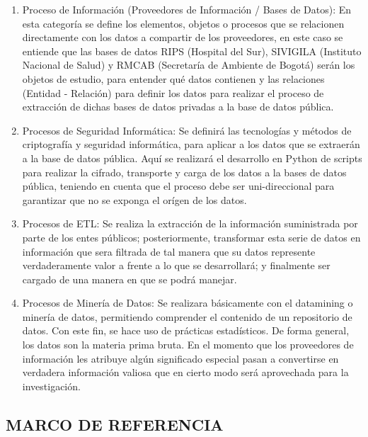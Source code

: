 \documentclass[a4paper, 12pt, oneside]{article}
\theoremstyle{definition}
\theoremstyle{remark}
\begin{document}
\begin{enumerate}[I]
\begin{enumerate}[1.]
\item{Proceso de Información (Proveedores de Información / Bases de Datos): En esta categoría se define los elementos, objetos o procesos que se relacionen directamente con los datos a compartir de los proveedores, en este caso se entiende que las bases de datos RIPS (Hospital del Sur), SIVIGILA (Instituto Nacional de Salud) y RMCAB (Secretaría de Ambiente de Bogotá) serán los objetos de estudio, para entender qué datos contienen y las relaciones (Entidad - Relación) para definir los datos para realizar el proceso de extracción de dichas bases de datos privadas a la base de datos pública.}
\item{Procesos de Seguridad Informática: Se definirá las tecnologías y métodos de criptografía y seguridad informática, para aplicar a los datos que se extraerán a la base de datos pública. Aquí se realizará el desarrollo en Python de scripts para realizar la cifrado, transporte y carga de los datos a la bases de datos pública, teniendo en cuenta que el proceso debe ser uni-direccional para garantizar que no se exponga el orígen de los datos.}
\item{Procesos de ETL: Se realiza la extracción de la información suministrada por parte de los entes públicos; posteriormente, transformar esta serie de datos en información que sera filtrada de tal manera que su datos represente verdaderamente valor a  frente a lo que se desarrollará; y finalmente ser cargado de una manera en que se podrá manejar. }
\item{Procesos de Minería de Datos: Se realizara básicamente con el datamining o minería de datos, permitiendo comprender el contenido de un repositorio de datos. Con este fin, se hace uso de prácticas estadísticos. De forma general, los datos son la materia prima bruta. En el momento que los proveedores de información les atribuye algún significado especial pasan a convertirse en verdadera información valiosa que en cierto modo será aprovechada para la investigación.}

\end{enumerate}
\end{enumerate}

\clearpage

\begin{center}
 \section{MARCO DE REFERENCIA}
\end{center}
\end{document}
